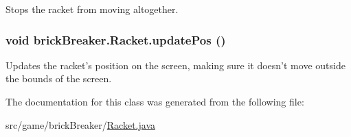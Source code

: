 \label{classbrick_breaker_1_1_racket_a1d5ee505bd935fa6b8ea6001c15a57b9}
Stops the racket from moving altogether. \hypertarget{classbrick_breaker_1_1_racket_ab439c6379d04064940f4a09007d5fe4c}{
\subsubsection[{updatePos}]{\setlength{\rightskip}{0pt plus 5cm}void brickBreaker.Racket.updatePos ()}}
\label{classbrick_breaker_1_1_racket_ab439c6379d04064940f4a09007d5fe4c}
Updates the racket's position on the screen, making sure it doesn't move outside the bounds of the screen. 

The documentation for this class was generated from the following file:\begin{DoxyCompactItemize}
\item 
src/game/brickBreaker/\hyperlink{_racket_8java}{Racket.java}\end{DoxyCompactItemize}
